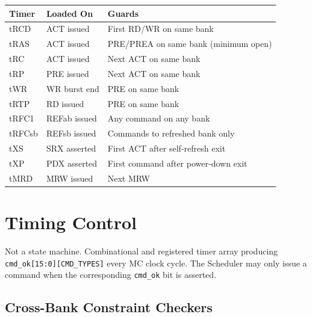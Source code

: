 \documentclass[10pt,a4paper]{article}
\newcommand{\Th}[1]{\cellcolor{thbg}\textbf{\small\color{acc1}#1}}
\newcommand{\RA}{\rowcolor{white}}
\newcommand{\RB}{\rowcolor{altbg}}
\begin{document}
\begin{center}
\begin{tabularx}{0.92\linewidth}{@{} l l X @{}}
\toprule
\Th{Timer} & \Th{Loaded On} & \Th{Guards} \\
\midrule
\RA tRCD    & ACT issued   & First RD/WR on same bank \\
\RB tRAS    & ACT issued   & PRE/PREA on same bank (minimum open) \\
\RA tRC     & ACT issued   & Next ACT on same bank \\
\RB tRP     & PRE issued   & Next ACT on same bank \\
\RA tWR     & WR burst end & PRE on same bank \\
\RB tRTP    & RD issued    & PRE on same bank \\
\RA tRFC1   & REFab issued & Any command on any bank \\
\RB tRFCsb  & REFsb issued & Commands to refreshed bank only \\
\RA tXS     & SRX asserted & First ACT after self-refresh exit \\
\RB tXP     & PDX asserted & First command after power-down exit \\
\RA tMRD    & MRW issued   & Next MRW \\
\bottomrule
\end{tabularx}
\end{center}

\section{Timing Control}

Not a state machine. Combinational and registered timer array producing
\texttt{cmd\_ok[15:0][CMD\_TYPES]} every MC clock cycle. The Scheduler may only
issue a command when the corresponding \texttt{cmd\_ok} bit is asserted.

\subsection{Cross-Bank Constraint Checkers}
\end{document}

